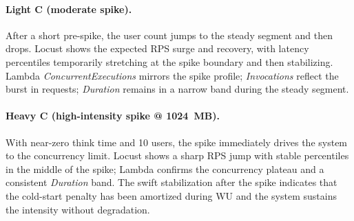 \documentclass[11pt,a4paper]{article}
\begin{document}
\paragraph{Light C (moderate spike).}
After a short pre-spike, the user count jumps to the steady segment and then drops. Locust shows the expected RPS surge and recovery, with latency percentiles temporarily stretching at the spike boundary and then stabilizing. Lambda \emph{ConcurrentExecutions} mirrors the spike profile; \emph{Invocations} reflect the burst in requests; \emph{Duration} remains in a narrow band during the steady segment.



\paragraph{Heavy C (high-intensity spike @ \SI{1024}{MB}).}
With near-zero think time and 10 users, the spike immediately drives the system to the concurrency limit. Locust shows a sharp RPS jump with stable percentiles in the middle of the spike; Lambda confirms the concurrency plateau and a consistent \emph{Duration} band. The swift stabilization after the spike indicates that the cold-start penalty has been amortized during WU and the system sustains the intensity without degradation.


\end{document}
